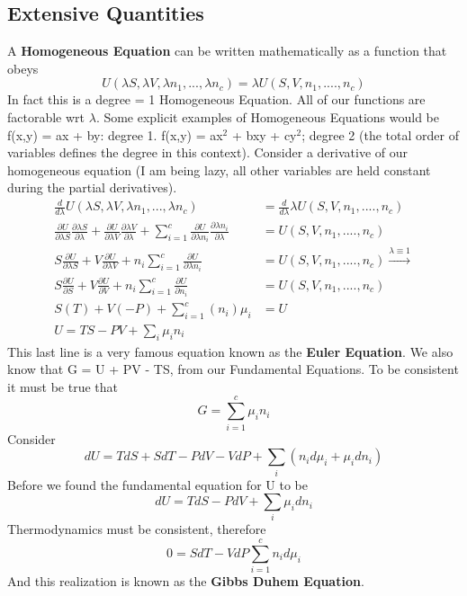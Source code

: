 \documentclass{article}
\begin{document}
\subsection*{Extensive Quantities}
A \textbf{Homogeneous Equation} can be written mathematically as a function that obeys
\begin{equation}
    U(\lambda S, \lambda V, \lambda n_1, ..., \lambda n_c) = \lambda U(S,V,n_1,....,n_c)
\end{equation}
In fact this is a degree = 1 Homogeneous Equation.
All of our functions are factorable wrt $\lambda$. 
Some explicit examples of Homogeneous Equations would be
f(x,y) = ax + by: degree 1. f(x,y) = ax$^2$ + bxy + cy$^2$; degree 2 (the total order of variables defines the degree in this context). 
Consider a derivative of our homogeneous equation (I am being lazy, all other variables are held constant during the partial derivatives). 
\begin{equation}
    \begin{split}
        \frac{d}{d\lambda} U(\lambda S, \lambda V, \lambda n_1, ..., \lambda n_c) &=  \frac{d}{d\lambda} \lambda U(S,V,n_1,....,n_c) \\
        \frac{\partial U}{\partial \lambda S }\frac{\partial \lambda S}{\partial \lambda} +  \frac{\partial U}{\partial \lambda V }\frac{\partial \lambda V}{\partial \lambda} +  \sum_{i=1}^c\frac{\partial U}{\partial \lambda n_i }\frac{\partial \lambda n_i}{\partial \lambda} &= U(S,V,n_1,....,n_c)\\
        S \frac{\partial U}{\partial \lambda S } +  V \frac{\partial U}{\partial \lambda V } +  n_i \sum_{i=1}^c\frac{\partial U}{\partial \lambda n_i } &= U(S,V,n_1,....,n_c) \xrightarrow{\lambda \equiv 1}\\
         S \frac{\partial U}{\partial S } +  V \frac{\partial U}{\partial V } +  n_i \sum_{i=1}^c\frac{\partial U}{\partial n_i } &= U(S,V,n_1,....,n_c)\\
         S(T) + V(-P) +\sum_{i=1}^c (n_i)\mu_i &= U \\
         U = TS - PV + \sum_i\mu_in_i
    \end{split}
\end{equation}
This last line is a very famous equation known as the \textbf{Euler Equation}. 
We also know that G = U + PV - TS, from our Fundamental Equations.
To be consistent it must be true that 
\begin{equation}
    G = \sum_{i=1}^c\mu_in_i
\end{equation}
Consider 
\begin{equation}
    dU = TdS + SdT -PdV - VdP +\sum_i(n_id\mu_i + \mu_idn_i)
\end{equation}
Before we found the fundamental equation for U to be
\begin{equation}
    dU = TdS - PdV + \sum_i\mu_idn_i
\end{equation}
Thermodynamics must be consistent, therefore
\begin{equation}
    0 = SdT -VdP \sum_{i=1}^cn_id\mu_i
\end{equation}
And this realization is known as the \textbf{Gibbs Duhem Equation}.
\end{document}
